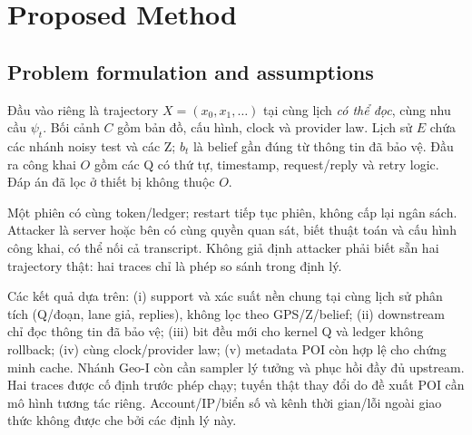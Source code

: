 \section{Proposed Method}
\subsection{Problem formulation and assumptions}
Đầu vào riêng là trajectory $X=(x_0,x_1,\ldots)$ tại cùng lịch \emph{có thể đọc}, cùng nhu cầu $\psi_t$.
Bối cảnh $C$ gồm bản đồ, cấu hình, clock và provider law. Lịch sử $E$ chứa các nhánh noisy test và các Z;
$b_t$ là belief gần đúng từ thông tin đã bảo vệ. Đầu ra công khai $O$ gồm các Q có thứ tự, timestamp,
request/reply và retry logic. Đáp án đã lọc ở thiết bị không thuộc $O$.

Một phiên có cùng token/ledger; restart tiếp tục phiên, không cấp lại ngân sách. Attacker là server hoặc
bên có cùng quyền quan sát, biết thuật toán và cấu hình công khai, có thể nối cả transcript. Không giả định
attacker phải biết sẵn hai trajectory thật: hai traces chỉ là phép so sánh trong định lý.

Các kết quả dựa trên: (i) support và xác suất nền chung tại cùng lịch sử phân tích (Q/đoạn, lane giả, replies),
không lọc theo GPS/Z/belief; (ii) downstream chỉ đọc
thông tin đã bảo vệ; (iii) bit đều mới cho kernel Q và ledger không rollback; (iv) cùng clock/provider law;
(v) metadata POI còn hợp lệ cho chứng minh cache. Nhánh Geo-I còn cần sampler lý tưởng và phục hồi đầy đủ
upstream. Hai traces được cố định trước phép chạy; tuyến thật thay đổi do đề xuất POI cần mô hình tương tác riêng.
Account/IP/biển số và kênh thời gian/lỗi ngoài giao thức không được che bởi các định lý này.

